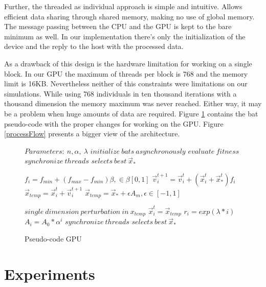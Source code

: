 \documentclass[conference]{IEEEtran}
\begin{document}
Further, the threaded as individual approach is simple and intuitive.
Allows efficient data sharing through shared memory, making no use of global memory.
The message passing between the CPU and the GPU is kept to the bare minimum as well.
In our implementation there's only the initialization of the device and
the reply to the host with the processed data.


As a drawback of this design is the hardware limitation for working
on a single block. In our GPU the maximum of threads per block is 768
and the memory limit is 16KB. Nevertheless neither of this constraints
were limitations on our simulations. While using 768 individuals in ten
thousand iterations with a thousand dimension the memory maximum was
never reached. Either way, it may be a problem when huge amounts of data
are required. Figure \ref{gpu-pseudo} contains the bat pseudo-code with
the proper changes for working on the GPU. Figure \ref{processFlow}
presents a bigger view of the architecture.

\begin{figure}[H]
\begin{algorithmic}[1]
\State $Parameters:\ n,\alpha,\ \lambda$
\State $initialize\ bats\ asynchronously$
\State $evaluate\ fitness$
\State $synchronize\ threads$
\State $selects\ best\ \vec{x}_*$

        \State $f_i=f_{min} + (f_{max} - f_{min})\beta, \in \beta [0,1]$
        \State $\vec{v}_i^{t+1} = \vec{v}_i^{t} + (\vec{x}_i^{t} + \vec{x}_*^{t})f_i$
        \State $\vec{x}_{temp} = \vec{x}_i^{t} + \vec{v}_i^{t+1}$
            \State $\vec{x}_{temp} = \vec{x}_* + \epsilon A_m, \epsilon \in [-1, 1]$
        \EndIf

        \State $single\ dimension\ perturbation\ in\ x_{temp}$
            \State $\vec{x}_i^t = \vec{x}_{temp}$
            \State $r_i = exp(\lambda * i)$
            \State $A_i =  A_{0} * \alpha^i$
        \EndIf
    \EndFor
    \State $synchronize\ threads$
    \State $selects\ best\ \vec{x}_*$
\EndWhile
\end{algorithmic}
\caption{Pseudo-code GPU}
\label{gpu-pseudo}
\end{figure}


\section{Experiments} \label{experiments}%
\end{document}
